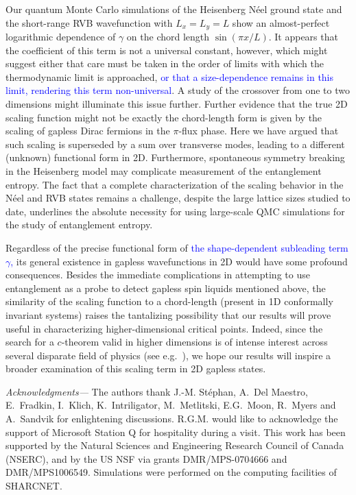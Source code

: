 \documentclass[prb,aps,twocolumn,floatfix,amsmath,amssymb,superscriptaddress,tightenlines]{revtex4}
\begin{document}
Our quantum Monte Carlo simulations of the Heisenberg N\'eel ground state and the short-range RVB wavefunction with $L_x=L_y=L$ show an almost-perfect logarithmic dependence of $\gamma$ on the chord length $\sin(\pi x/L)$.
It appears that the coefficient of this term is not a universal constant, however, which might suggest either that care must be taken in the order of limits with which the thermodynamic limit is approached, \textcolor{blue}{or that a size-dependence remains in this limit, rendering this term non-universal}. A study of the crossover from one to two dimensions might illuminate this issue further.  Further evidence that the true 2D scaling function might not be exactly the chord-length form is given by the scaling of gapless Dirac fermions in the $\pi$-flux phase. Here we have argued that such scaling is superseded by a sum over transverse modes, leading to a different (unknown) functional form in 2D.  Furthermore,  spontaneous symmetry breaking in the Heisenberg model may complicate measurement of the entanglement entropy.  The fact that a complete characterization of the scaling behavior in the N\'eel and RVB states remains a challenge, despite the large lattice sizes studied to date, underlines the absolute necessity for using large-scale QMC simulations for the study of entanglement entropy.

Regardless of the precise functional form of 
\textcolor{blue}{the shape-dependent subleading term $\gamma$,}
its general existence in gapless wavefunctions in 2D would have some profound consequences.  
Besides the immediate complications in attempting to use entanglement as a probe to detect gapless spin liquids mentioned above,
the similarity of the scaling function to a chord-length (present in 1D conformally invariant systems) 
raises the tantalizing possibility that our results will prove useful in characterizing higher-dimensional critical points.
Indeed, since the search for a $c$-theorem \cite{Zamo} valid in higher dimensions is of intense interest across several disparate field of physics (see e.g.\ \cite{Cardy88,ryu,Myers,Komargodski}),
we hope our results will inspire a broader examination of this scaling term in 2D gapless states.

{\it Acknowledgments---} 
The authors thank J.-M. St\'ephan, A.~Del Maestro, E.~Fradkin, I.~Klich, K.~Intriligator,  M.~Metlitski, E.G.~Moon, R.~Myers and A.~Sandvik for enlightening discussions. 
R.G.M. would like to acknowledge the support of Microsoft Station Q for hospitality during a visit.
This work has been supported by the Natural Sciences and Engineering
Research Council of Canada (NSERC), and by the US NSF via grants DMR/MPS-0704666 and DMR/MPS1006549.  Simulations were performed on the computing facilities of SHARCNET.



\end{document}
